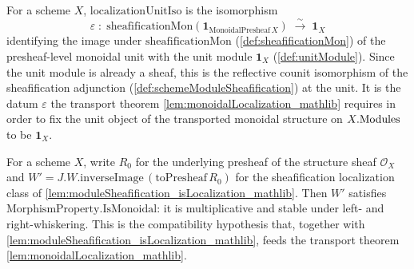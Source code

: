 \begin{definition}

  \label{def:localizationUnitIso}
  For a scheme \(X\), \(\mathrm{localizationUnitIso}\) is the isomorphism
  \[
    \varepsilon \;:\;
      \mathrm{sheafificationMon}(\mathbf{1}_{\mathrm{MonoidalPresheaf}\,X})
      \;\xrightarrow{\ \sim\ }\; \mathbf{1}_X
  \]
  identifying the image under \(\mathrm{sheafificationMon}\)
  (\cref{def:sheafificationMon}) of the presheaf-level monoidal unit with the
  unit module \(\mathbf{1}_X\) (\cref{def:unitModule}). Since the unit module is
  already a sheaf, this is the reflective counit isomorphism of the
  sheafification adjunction (\cref{def:schemeModuleSheafification}) at the unit.
  It is the datum \(\varepsilon\) the transport theorem
  \cref{lem:monoidalLocalization_mathlib} requires in order to fix the unit
  object of the transported monoidal structure on \(X.\mathrm{Modules}\) to be
  \(\mathbf{1}_X\).
\end{definition}

\begin{definition}

  \label{def:sheafModule_W_isMonoidal}
  For a scheme \(X\), write \(R_0\) for the underlying presheaf of the structure
  sheaf \(\mathcal{O}_X\) and
  \(W' = J.W.\mathrm{inverseImage}\,(\mathrm{toPresheaf}\,R_0)\) for the
  sheafification localization class of
  \cref{lem:moduleSheafification_isLocalization_mathlib}. Then \(W'\) satisfies
  \(\mathrm{MorphismProperty.IsMonoidal}\): it is multiplicative and stable under
  left- and right-whiskering. This is the compatibility hypothesis that, together
  with \cref{lem:moduleSheafification_isLocalization_mathlib}, feeds the transport
  theorem \cref{lem:monoidalLocalization_mathlib}.
\end{definition}

